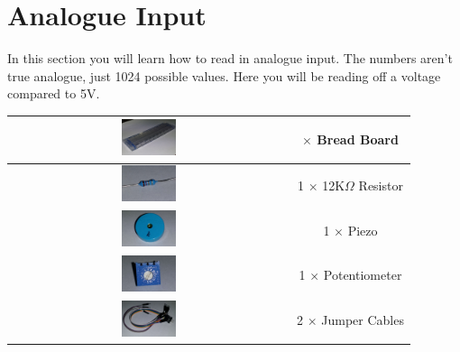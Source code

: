 \section{Analogue Input}

In this section you will learn how to read in analogue input.
The numbers aren't true analogue, just 1024 possible values.
Here you will be reading off a voltage compared to 5V.


\setlength{\tabcolsep}{0pt}
\begin{center}
\begin{tabular}{|c| c |}
\hline
    \includegraphics[align=c,width=0.2\textwidth]{./Graphics/breadboard}
    & 
    \begin{minipage}[t]{0.2\textwidth}
        \centering
        1 $\times$ Bread Board 
    \end{minipage}\\ \hline
    \includegraphics[align=c,width=0.2\textwidth]{./Graphics/12k_resistor} 
    & 1 $\times$ 12K$\Omega$ Resistor \\ \hline
    \includegraphics[align=c,width=0.2\textwidth]{./Graphics/piezo}
    & 1 $\times$ Piezo\\ \hline
    \includegraphics[align=c,width=0.2\textwidth]{./Graphics/pot}
    & 1 $\times$ Potentiometer\\ \hline
    \includegraphics[align=c,width=0.2\textwidth]{./Graphics/jumper_cables}
    & 2 $\times$ Jumper Cables \\ \hline
  \end{tabular}
\end{center}

